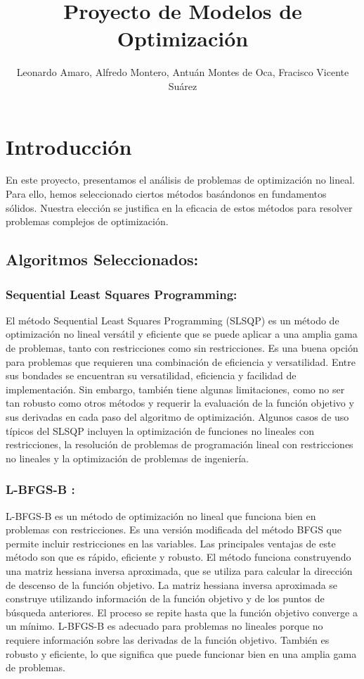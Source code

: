 \documentclass{article}
\title{Proyecto de  Modelos de Optimización }
\author{Leonardo Amaro, Alfredo Montero, Antuán Montes de Oca, Fracisco Vicente Suárez}
\date{}
\begin{document}
\maketitle

\section{Introducción}
En este proyecto, presentamos el análisis de problemas de optimización no lineal. Para ello, hemos seleccionado ciertos métodos basándonos en fundamentos sólidos. Nuestra elección se justifica en la eficacia de estos métodos para resolver problemas complejos de optimización.
\subsection{Algoritmos Seleccionados:}
\subsubsection{Sequential Least Squares Programming:}
El método Sequential Least Squares Programming (SLSQP) es un método de optimización no lineal versátil y eficiente que se puede aplicar a una amplia gama de problemas, tanto con restricciones como sin restricciones. Es una buena opción para problemas que requieren una combinación de eficiencia y versatilidad. Entre sus bondades se encuentran su versatilidad, eficiencia y facilidad de implementación. Sin embargo, también tiene algunas limitaciones, como no ser tan robusto como otros métodos y requerir la evaluación de la función objetivo y sus derivadas en cada paso del algoritmo de optimización. Algunos casos de uso típicos del SLSQP incluyen la optimización de funciones no lineales con restricciones, la resolución de problemas de programación lineal con restricciones no lineales y la optimización de problemas de ingeniería.

\subsubsection{L-BFGS-B :}


L-BFGS-B es un método de optimización no lineal que funciona bien en problemas con restricciones. Es una versión modificada del método BFGS que permite incluir restricciones en las variables. Las principales ventajas de este método son que es rápido, eficiente y robusto. El método funciona construyendo una matriz hessiana inversa aproximada, que se utiliza para calcular la dirección de descenso de la función objetivo. La matriz hessiana inversa aproximada se construye utilizando información de la función objetivo y de los puntos de búsqueda anteriores. El proceso se repite hasta que la función objetivo converge a un mínimo. L-BFGS-B es adecuado para problemas no lineales porque no requiere información sobre las derivadas de la función objetivo. También es robusto y eficiente, lo que significa que puede funcionar bien en una amplia gama de problemas.
\end{document}
